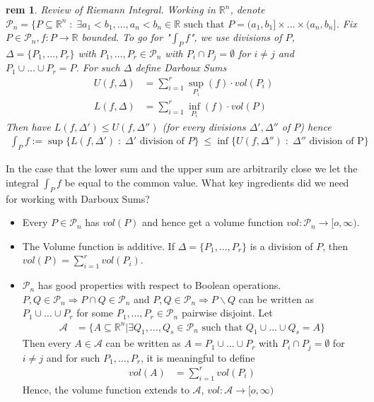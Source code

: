 \documentclass[letterpaper, 12pt]{article}
\newcommand{\st}{\; : \; }
\newcommand{\fin}{\qquad \quad \hfill \framebox[1.75mm][l]{\,}}
\newcommand{\bR}{\mathbb{R}}
\newcommand{\cP}{\mathcal{P}}
\newcommand{\sA}{\mathcal{A}}
\theoremstyle{stdthm}
\theoremstyle{stddef}
\newtheorem{rem}[thm]{rem} %
\theoremstyle{stdnonum}
\theoremstyle{stdqands}
\theoremstyle{stdbold}
\begin{document}
\begin{rem}{Review of Riemann Integral.}
 Working in $\bR^n$, denote $\mathcal{P}_n = \{ P \subseteq \bR^n \st \exists a_1 < b_1, \dots, a_n < b_n \in \bR \text{ such that } P = (a_1,b_1]\times \dots \times (a_n,b_n]$. Fix $P \in \cP_n, f:P\rightarrow \bR$ bounded. To go for "$\int_P f$", we use divisions of $P$, $\Delta = \{P_1,\dots, P_r\}$ with $P_1,\dots, P_r \in \cP_n$ with $P_i \cap P_j = \emptyset$ for $i\neq j$ and $P_1 \cup \dots \cup P_r = P$. For such $\Delta$ define Darboux Sums
 \begin{align*}
 U(f,\Delta) &= \sum_{i=1}^r \sup_{P_i}(f) \cdot vol(P_i)\\
 L(f,\Delta) &= \sum_{i=1}^r \inf_{P_i}(f)\cdot vol(P)
 \end{align*}
 Then have $L(f,\Delta') \leq U(f,\Delta'')$ (for every divisions $\Delta',\Delta''$ of $P$) hence
 \begin{align*}
 \int_P f:= \sup \{L(f,\Delta') \st \Delta' \text{ division of } P\} & \leq \inf \{ U(f,\Delta '') \st \Delta'' \text{ division of P} \}
 \end{align*}
\end{rem} 
In the case that the lower sum and the upper sum are arbitrarily close we let the integral $\int_P f$ be equal to the common value. What key ingredients did we need for working with Darboux Sums? 
\begin{itemize}
\item Every $P\in \cP_n$ has $vol(P)$ and hence get a volume function $vol:\cP_n \rightarrow [o,\infty)$.
\item The Volume function is additive. If $\Delta = \{P_1,\dots, P_r\}$ is a division of $P$, then $vol(P) = \sum_{i=1}^r vol(P_i)$. 
\item  $\cP_n$ has good properties with respect to Boolean operations. $P,Q \in \cP_n \Rightarrow P \cap Q \in \cP_n$ and $P,Q \in \cP_n \Rightarrow P\backslash Q $ can be written as $P_1\cup \dots \cup P_r$ for some $P_1,\dots, P_r \in \cP_n$ pairwise disjoint. Let 
\begin{align*}
\sA &= \{A \subseteq \bR^n | \exists Q_1,\dots, Q_s \in \cP_n \text{ such that } Q_1 \cup \dots \cup Q_s = A \}
\end{align*}
Then every $A\in \sA$ can be written as $A = P_1 \cup \dots \cup P_r$ with $P_i \cap P_j = \emptyset$ for $i\neq j$ and for such $P_1,\dots, P_r$, it is meaningful to define \begin{align*}
vol(A) &= \sum_{i=1}^r vol(P_i)
\end{align*}
Hence, the volume function extends to $\sA$, $vol:\sA \rightarrow [o,\infty)$
  
\end{itemize}
\end{document}
